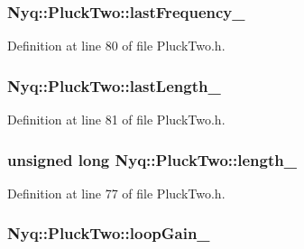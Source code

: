 \subsubsection[{\texorpdfstring{last\+Frequency\+\_\+}{lastFrequency_}}]{ Nyq\+::\+Pluck\+Two\+::last\+Frequency\+\_\+\hspace{0.3cm}{\ttfamily [protected]}}\hypertarget{class_nyq_1_1_pluck_two_a7354fa7688bb8f06eb7539613d4dea9b}{}\label{class_nyq_1_1_pluck_two_a7354fa7688bb8f06eb7539613d4dea9b}


Definition at line 80 of file Pluck\+Two.\+h.

\subsubsection[{\texorpdfstring{last\+Length\+\_\+}{lastLength_}}]{ Nyq\+::\+Pluck\+Two\+::last\+Length\+\_\+\hspace{0.3cm}{\ttfamily [protected]}}\hypertarget{class_nyq_1_1_pluck_two_a32f29e60b96fae38c03b354e693fa641}{}\label{class_nyq_1_1_pluck_two_a32f29e60b96fae38c03b354e693fa641}


Definition at line 81 of file Pluck\+Two.\+h.

\subsubsection[{\texorpdfstring{length\+\_\+}{length_}}]{\setlength{\rightskip}{0pt plus 5cm}unsigned long Nyq\+::\+Pluck\+Two\+::length\+\_\+\hspace{0.3cm}{\ttfamily [protected]}}\hypertarget{class_nyq_1_1_pluck_two_aa28cf40cc6d1d1115b059feb1faaef8c}{}\label{class_nyq_1_1_pluck_two_aa28cf40cc6d1d1115b059feb1faaef8c}


Definition at line 77 of file Pluck\+Two.\+h.

\subsubsection[{\texorpdfstring{loop\+Gain\+\_\+}{loopGain_}}]{ Nyq\+::\+Pluck\+Two\+::loop\+Gain\+\_\+\hspace{0.3cm}{\ttfamily [protected]}}\hypertarget{class_nyq_1_1_pluck_two_a6c65ee2ac1c22d908db2d3d3f760ab4d}{}\label{class_nyq_1_1_pluck_two_a6c65ee2ac1c22d908db2d3d3f760ab4d}


